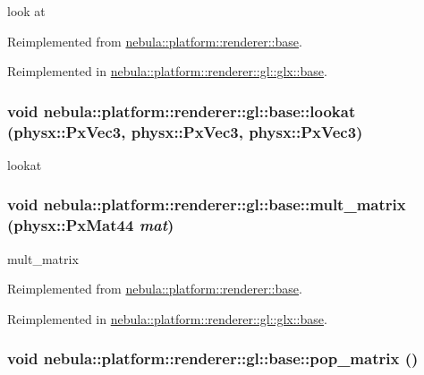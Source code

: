 look at 

Reimplemented from \hyperlink{classnebula_1_1platform_1_1renderer_1_1base_a178cbf87e4677f7efaf44ce5de29a580}{nebula::platform::renderer::base}.

Reimplemented in \hyperlink{classnebula_1_1platform_1_1renderer_1_1gl_1_1glx_1_1base_ac1e401ba57d7b5a09ba684529092ea38}{nebula::platform::renderer::gl::glx::base}.\hypertarget{classnebula_1_1platform_1_1renderer_1_1gl_1_1base_a472893303eb888f3742b5f79ee3d4f10}{
\subsubsection[{lookat}]{\setlength{\rightskip}{0pt plus 5cm}void nebula::platform::renderer::gl::base::lookat (physx::PxVec3, \/  physx::PxVec3, \/  physx::PxVec3)}}
\label{classnebula_1_1platform_1_1renderer_1_1gl_1_1base_a472893303eb888f3742b5f79ee3d4f10}


lookat \hypertarget{classnebula_1_1platform_1_1renderer_1_1gl_1_1base_a31fd2eab976e8d85e0d9ddcf9435b4e8}{
\subsubsection[{mult\_\-matrix}]{\setlength{\rightskip}{0pt plus 5cm}void nebula::platform::renderer::gl::base::mult\_\-matrix (physx::PxMat44 {\em mat})}}
\label{classnebula_1_1platform_1_1renderer_1_1gl_1_1base_a31fd2eab976e8d85e0d9ddcf9435b4e8}


mult\_\-matrix 

Reimplemented from \hyperlink{classnebula_1_1platform_1_1renderer_1_1base_a42be4fa519953220e66cebbc5d56ec31}{nebula::platform::renderer::base}.

Reimplemented in \hyperlink{classnebula_1_1platform_1_1renderer_1_1gl_1_1glx_1_1base_a3909d992dcbe8ef8af6e221633146c39}{nebula::platform::renderer::gl::glx::base}.\hypertarget{classnebula_1_1platform_1_1renderer_1_1gl_1_1base_a090d8f0a4b385b23d1576c43ea27e22e}{
\subsubsection[{pop\_\-matrix}]{\setlength{\rightskip}{0pt plus 5cm}void nebula::platform::renderer::gl::base::pop\_\-matrix ()}}
\label{classnebula_1_1platform_1_1renderer_1_1gl_1_1base_a090d8f0a4b385b23d1576c43ea27e22e}


